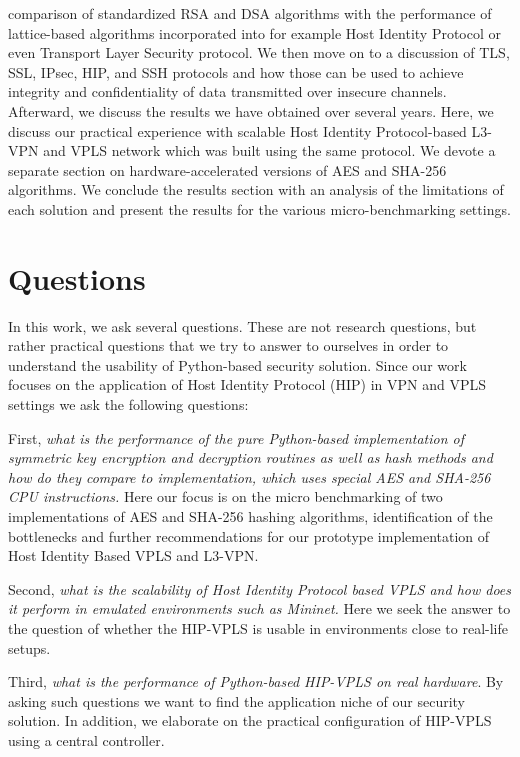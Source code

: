 comparison of standardized RSA and DSA algorithms with the performance of 
lattice-based algorithms incorporated into for example Host Identity Protocol 
or even Transport Layer Security protocol. We then move on to a discussion of 
TLS, SSL, IPsec, HIP, and SSH protocols and how those can be used to achieve 
integrity and confidentiality of data transmitted over insecure channels. 
Afterward, we discuss the results we have obtained 
over several years. Here, we discuss our practical experience 
with scalable Host Identity Protocol-based L3-VPN and VPLS network which was 
built using the same protocol. We devote a separate section on 
hardware-accelerated versions of AES and SHA-256 algorithms. We conclude 
the results section with an analysis of the limitations of each solution 
and present the results for the various micro-benchmarking settings.

\section{Questions}

In this work, we ask several questions. These are not research questions, 
but rather practical questions that we try to answer to ourselves in order to 
understand the usability of Python-based security solution. Since our work 
focuses on the application of Host Identity Protocol (HIP) in VPN and VPLS 
settings we ask the following questions:

First, {\it what is the performance of the pure Python-based implementation of 
symmetric key encryption and decryption routines as well as hash methods and 
how do they compare to implementation, which uses special AES and SHA-256 CPU 
instructions.} Here our focus is on the micro benchmarking of two implementations 
of AES and SHA-256 hashing algorithms, identification of the bottlenecks and 
further recommendations for our prototype implementation of Host Identity Based VPLS and L3-VPN.

Second, {\it what is the scalability of Host Identity Protocol based VPLS and how does 
it perform in emulated environments such as Mininet.} Here we seek the answer to 
the question of whether the HIP-VPLS is usable in environments close to real-life setups.

Third, {\it what is the performance of Python-based HIP-VPLS on real hardware}. By 
asking such questions we want to find the application niche of our security solution. In addition, 
we elaborate on the practical configuration of HIP-VPLS using a central controller.

